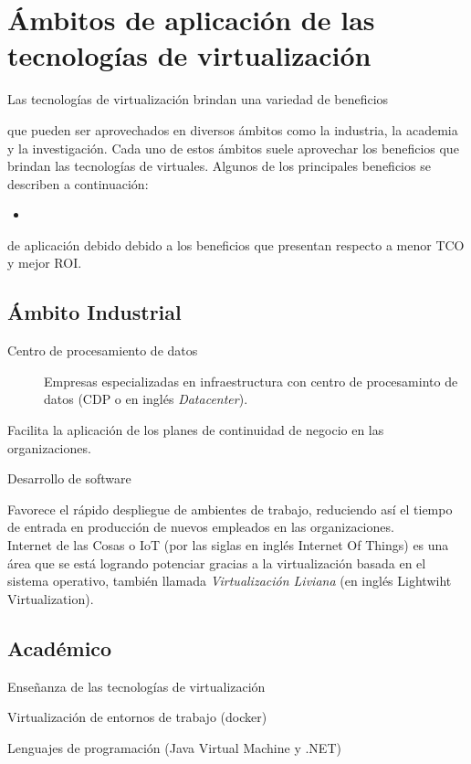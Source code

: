 \section{Ámbitos de aplicación de las tecnologías de virtualización} \label{ambitos}

Las tecnologías de virtualización brindan una variedad de beneficios

que pueden ser aprovechados en diversos ámbitos como la industria, la academia y la investigación. Cada uno de estos ámbitos suele aprovechar los beneficios que brindan las tecnologías de virtuales. Algunos de los principales beneficios se describen a continuación:\\

\begin{itemize}
	\item 
\end{itemize}

  de aplicación debido debido a los beneficios que presentan respecto a menor TCO y mejor ROI. 



\subsection{Ámbito Industrial}

\begin{description}
	\item[Centro de procesamiento de datos] Empresas especializadas en infraestructura con centro de procesaminto de datos (CDP o en inglés \textit{Datacenter}).
\end{description}



Facilita la aplicación de los planes de continuidad de negocio en las organizaciones. 

Desarrollo de software

Favorece el rápido despliegue de ambientes de trabajo, reduciendo así el tiempo de entrada en producción de nuevos empleados en las organizaciones. \\


Internet de las Cosas o IoT (por las siglas en inglés Internet Of Things) es una área que se está logrando potenciar gracias a la virtualización basada en el sistema operativo, también llamada \textit{Virtualización Liviana} (en inglés Lightwiht Virtualization). 



\subsection{Académico}

Enseñanza de las tecnologías de virtualización


Virtualización de entornos de trabajo (docker)


Lenguajes de programación (Java Virtual Machine y .NET)
